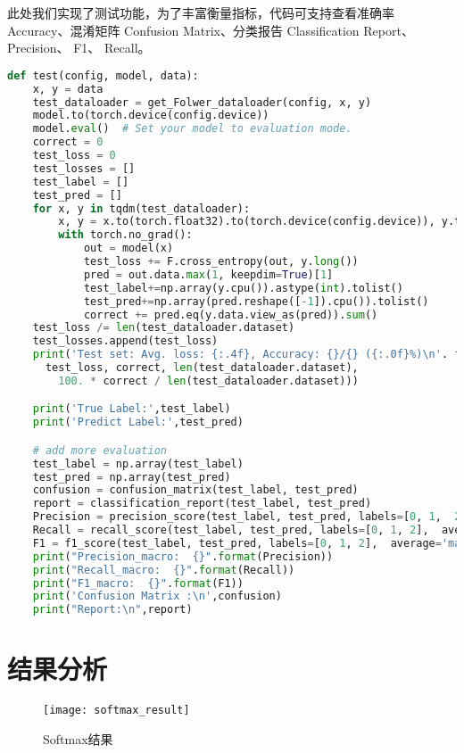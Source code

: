 \documentclass[lang=cn,a4paper]{elegantpaper}
\begin{document}
此处我们实现了测试功能，为了丰富衡量指标，代码可支持查看准确率 Accuracy、混淆矩阵 Confusion Matrix、分类报告 Classification Report、 Precision、 F1、 Recall。
\begin{lstlisting}[language = python]
  def test(config, model, data):
    x, y = data
    test_dataloader = get_Folwer_dataloader(config, x, y)
    model.to(torch.device(config.device))
    model.eval()  # Set your model to evaluation mode.
    correct = 0
    test_loss = 0
    test_losses = []
    test_label = []
    test_pred = []
    for x, y in tqdm(test_dataloader):
        x, y = x.to(torch.float32).to(torch.device(config.device)), y.to  (torch.float32).to(torch.device(config.device))
        with torch.no_grad():
            out = model(x)
            test_loss += F.cross_entropy(out, y.long())
            pred = out.data.max(1, keepdim=True)[1]
            test_label+=np.array(y.cpu()).astype(int).tolist()
            test_pred+=np.array(pred.reshape([-1]).cpu()).tolist()
            correct += pred.eq(y.data.view_as(pred)).sum()
    test_loss /= len(test_dataloader.dataset)
    test_losses.append(test_loss)
    print('Test set: Avg. loss: {:.4f}, Accuracy: {}/{} ({:.0f}%)\n'. format(
      test_loss, correct, len(test_dataloader.dataset),
        100. * correct / len(test_dataloader.dataset)))

    print('True Label:',test_label)
    print('Predict Label:',test_pred)

    # add more evaluation
    test_label = np.array(test_label)
    test_pred = np.array(test_pred)
    confusion = confusion_matrix(test_label, test_pred)
    report = classification_report(test_label, test_pred)
    Precision = precision_score(test_label, test_pred, labels=[0, 1,  2], average='macro')
    Recall = recall_score(test_label, test_pred, labels=[0, 1, 2],  average='macro')
    F1 = f1_score(test_label, test_pred, labels=[0, 1, 2],  average='macro')
    print("Precision_macro:  {}".format(Precision))
    print("Recall_macro:  {}".format(Recall))
    print("F1_macro:  {}".format(F1))
    print('Confusion Matrix :\n',confusion)
    print("Report:\n",report)
\end{lstlisting}




\section{结果分析}



\begin{figure}[H]
  \centering
  \texttt{[image: softmax\_result]}
  \caption{Softmax结果} 
  \label{Fig.1}
\end{figure}
\end{document}
